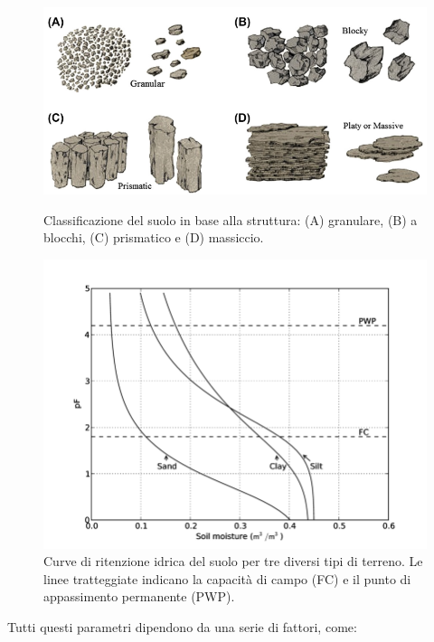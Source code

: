 \documentclass[12pt,a4paper,openright,twoside]{book}
\begin{document}
\begin{figure}[!tbp]
    \centering
    \begin{minipage}[t]{0.5\textwidth}
        \includegraphics[width=\linewidth]{./figures/soil-structure.png}
        \caption{Classificazione del suolo in base alla struttura: (A) granulare, (B) a blocchi, (C) prismatico e (D) massiccio\cite{RAI2017505}.}
        \label{fig.soil-structure}
    \end{minipage}
    \hfill
    \begin{minipage}[t]{0.4\textwidth}
        \includegraphics[width=\linewidth]{./figures/SWRC-In-different-soils.png}
        \caption{Curve di ritenzione idrica del suolo per tre diversi tipi di terreno. Le linee tratteggiate indicano la capacità di campo (FC) e il punto di appassimento permanente (PWP)\cite{Fuchsberger1023}.}
        \label{fig.SWRC-In-different-soils}
    \end{minipage}
\end{figure}
Tutti questi parametri dipendono da una serie di fattori, come:
\end{document}
